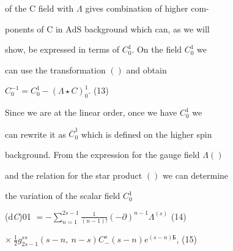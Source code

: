 \documentclass[a4paper,12pt]{article}
\begin{document}
of the $\mathrm{C}$ field with $\Lambda$ gives combination of higher com-

ponents of $\mathrm{C}$ in $\mathrm{A}\mathrm{d}\mathrm{S}$ background which can, as we will

show, be expressed in terms of $C_{0}^{1}$. On the field $C_{0}^{1}$ we

can use the transformation $()$ and obtain
\begin{center}
$C_{0}^{-1}=C_{0}^{1}-(\Lambda\star C)_{0}^{1}$.   (13)
\end{center}
Since we are at the linear order, once we have $C_{0}^{1}$ we

can rewrite it as $\overline{C}_{0}^{1}$ which is defined on the higher spin

background. From the expression for the gauge field $\Lambda ()$

and the relation for the star product $()$ we can determine

the variation of the scalar field $C_{0}^{1}$

(d{\it C})01 $=-\displaystyle \sum_{n=1}^{2s-1}\frac{1}{(n-1)!}(-\partial)^{n-1}\Lambda^{(s)}$ (14)
\begin{center}
$\displaystyle \times\ \frac{1}{2}g_{2s-1}^{ss}(s-n,\ n-s)C_{-}^{s}(s-n)e^{(s-n)Б}$,   (15)
\end{center}
\end{document}
